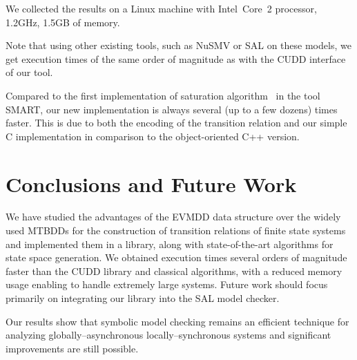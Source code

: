 \documentclass[a4paper]{easychair}
\begin{document}
We collected the results on a Linux machine with 
Intel~Core~2 processor, 1.2GHz, 1.5GB of memory.

Note that using other existing tools, such as NuSMV or SAL on these 
models, we get execution times of the same order of magnitude as with 
the CUDD interface of our tool.

Compared to the first implementation of saturation 
algorithm~\cite{Saturation2001} in the tool SMART, our new 
implementation is always several (up to a few dozens) times faster. This 
is due to both the encoding of the transition relation and our simple C 
implementation in comparison to the object-oriented C++ version.

\section{Conclusions and Future Work}

We have studied the advantages of the EVMDD data structure
over the widely used MTBDDs for the construction
of transition relations of finite state systems
and implemented them in a library, along with
state-of-the-art algorithms for state space generation.
We obtained execution times several orders of magnitude faster
than the CUDD library and classical algorithms,
with a reduced memory usage enabling to handle extremely large systems.
Future work should focus primarily on integrating our library
into the SAL model checker.

Our results show that symbolic model checking remains an efficient 
technique for analyzing globally--asynchronous locally--synchronous 
systems and significant improvements are still possible.



\end{document}
